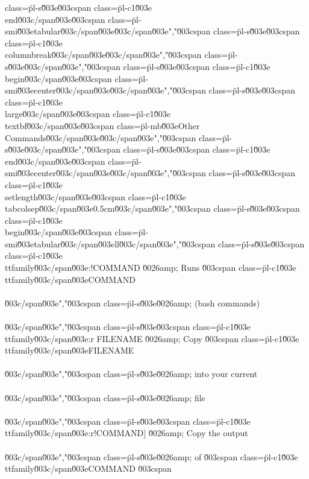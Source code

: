 class=\"pl-s\"\u003e\u003cspan class=\"pl-c1\"\u003e\\end\u003c/span\u003e{\u003cspan class=\"pl-smi\"\u003etabular\u003c/span\u003e}\u003c/span\u003e","\u003cspan class=\"pl-s\"\u003e\u003cspan class=\"pl-c1\"\u003e\\columnbreak\u003c/span\u003e\u003c/span\u003e","\u003cspan class=\"pl-s\"\u003e\u003c/span\u003e","\u003cspan class=\"pl-s\"\u003e\u003cspan class=\"pl-c1\"\u003e\\begin\u003c/span\u003e{\u003cspan class=\"pl-smi\"\u003ecenter\u003c/span\u003e}\u003c/span\u003e","\u003cspan class=\"pl-s\"\u003e\u003cspan class=\"pl-c1\"\u003e\\large\u003c/span\u003e\u003cspan class=\"pl-c1\"\u003e\\textbf\u003c/span\u003e{\u003cspan class=\"pl-mb\"\u003eOther Commands\u003c/span\u003e}\u003c/span\u003e","\u003cspan class=\"pl-s\"\u003e\u003c/span\u003e","\u003cspan class=\"pl-s\"\u003e\u003cspan class=\"pl-c1\"\u003e\\end\u003c/span\u003e{\u003cspan class=\"pl-smi\"\u003ecenter\u003c/span\u003e}\u003c/span\u003e","\u003cspan class=\"pl-s\"\u003e\u003cspan class=\"pl-c1\"\u003e\\setlength\u003c/span\u003e{\u003cspan class=\"pl-c1\"\u003e\\tabcolsep\u003c/span\u003e}{0.5cm}\u003c/span\u003e","\u003cspan class=\"pl-s\"\u003e\u003cspan class=\"pl-c1\"\u003e\\begin\u003c/span\u003e{\u003cspan class=\"pl-smi\"\u003etabular\u003c/span\u003e}{ll}\u003c/span\u003e","\u003cspan class=\"pl-s\"\u003e\u003cspan class=\"pl-c1\"\u003e\\ttfamily\u003c/span\u003e{:!COMMAND} \u0026amp; Runs \u003cspan class=\"pl-c1\"\u003e\\ttfamily\u003c/span\u003e{COMMAND}\\\\\u003c/span\u003e","\u003cspan class=\"pl-s\"\u003e\u0026amp; (bash commands)\\\\\u003c/span\u003e","\u003cspan class=\"pl-s\"\u003e\u003cspan class=\"pl-c1\"\u003e\\ttfamily\u003c/span\u003e{:r FILENAME} \u0026amp; Copy \u003cspan class=\"pl-c1\"\u003e\\ttfamily\u003c/span\u003e{FILENAME}\\\\\u003c/span\u003e","\u003cspan class=\"pl-s\"\u003e\u0026amp; into your current\\\\\u003c/span\u003e","\u003cspan class=\"pl-s\"\u003e\u0026amp; file\\\\\u003c/span\u003e","\u003cspan class=\"pl-s\"\u003e\u003cspan class=\"pl-c1\"\u003e\\ttfamily\u003c/span\u003e{:r!COMMAND]} \u0026amp; Copy the output\\\\\u003c/span\u003e","\u003cspan class=\"pl-s\"\u003e\u0026amp; of \u003cspan class=\"pl-c1\"\u003e\\ttfamily\u003c/span\u003e{COMMAND} \u003cspan 